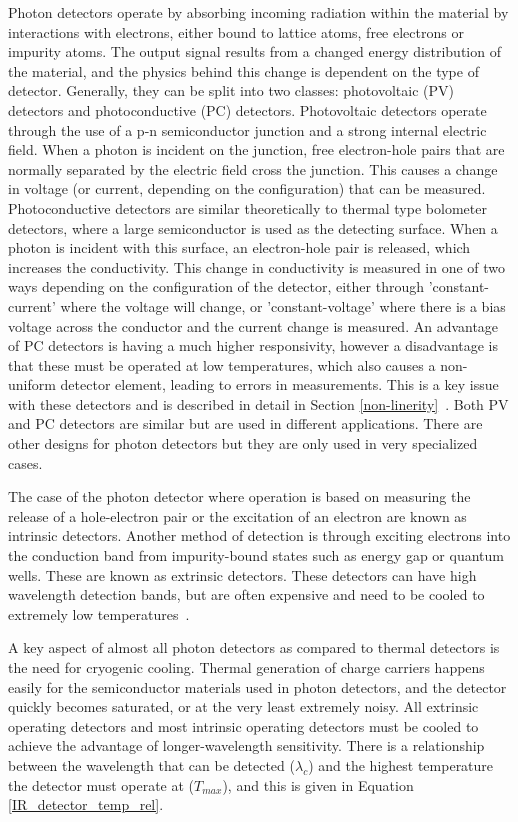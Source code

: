 Photon detectors operate by absorbing incoming radiation within the material by interactions with electrons, either bound to lattice atoms, free electrons or impurity atoms. The output signal results from a changed energy distribution of the material, and the physics behind this change is dependent on the type of detector. Generally, they can be split into two classes: photovoltaic (PV) detectors and photoconductive (PC) detectors. Photovoltaic detectors operate through the use of a p-n semiconductor junction and a strong internal electric field. When a photon is incident on the junction, free electron-hole pairs that are normally separated by the electric field cross the junction. This causes a change in voltage (or current, depending on the configuration) that can be measured. Photoconductive detectors are similar theoretically to thermal type bolometer detectors, where a large semiconductor is used as the detecting surface. When a photon is incident with this surface, an electron-hole pair is released, which increases the conductivity. This change in conductivity is measured in one of two ways depending on the configuration of the detector, either through 'constant-current' where the voltage will change, or 'constant-voltage' where there is a bias voltage across the conductor and the current change is measured. An advantage of PC detectors is having a much higher responsivity, however a disadvantage is that these must be operated at low temperatures, which also causes a non-uniform detector element, leading to errors in measurements. This is a key issue with these detectors and is described in detail in Section \ref{non-linerity}~\citep{IR_detector_textbook}. Both PV and PC detectors are similar but are used in different applications. There are other designs for photon detectors but they are only used in very specialized cases.

The case of the photon detector where operation is based on measuring the release of a hole-electron pair or the excitation of an electron are known as intrinsic detectors. Another method of detection is through exciting electrons into the conduction band from impurity-bound states such as energy gap or quantum wells. These are known as extrinsic detectors. These detectors can have high wavelength detection bands, but are often expensive and need to be cooled to extremely low temperatures~\citep{IR_detector_textbook}.

A key aspect of almost all photon detectors as compared to thermal detectors is the need for cryogenic cooling. Thermal generation of charge carriers happens easily for the semiconductor materials used in photon detectors, and the detector quickly becomes saturated, or at the very least extremely noisy. All extrinsic operating detectors and most intrinsic operating detectors must be cooled to achieve the advantage of longer-wavelength sensitivity. There is a relationship between the wavelength that can be detected ($\lambda_c$) and the highest temperature the detector must operate at ($T_{max}$), and this is given in Equation \ref{IR_detector_temp_rel}.

